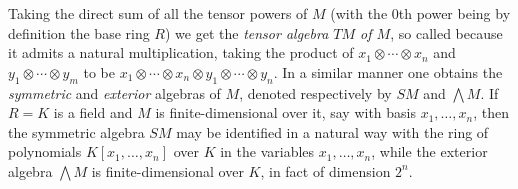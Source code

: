 \documentclass[10pt]{article}
\begin{document}
Taking the direct sum of all the tensor powers of $M$ (with the $0$th
power being by definition the base ring $R$) we get the {\sl tensor
  algebra $TM$ of $M$}, so called because it admits a natural
multiplication, taking the product of $x_1\otimes\cdots\otimes x_n$ and
$y_1\otimes\cdots\otimes y_m$ to be $x_1\otimes\cdots\otimes x_n\otimes
y_1\otimes\cdots\otimes y_n$. In a similar manner one obtains the {\sl
  symmetric} and {\sl exterior} algebras of $M$, denoted respectively by
$SM$ and $\bigwedge M$. If $R=K$ is a field and $M$ is
finite-dimensional over it, say with basis $x_1,\ldots,x_n$, then the
symmetric algebra $SM$ may be identified in a natural way with the ring
of polynomials $K[x_1,\ldots,x_n]$ over $K$ in the variables
$x_1,\ldots,x_n$, while the exterior algebra $\bigwedge M$ is
finite-dimensional over $K$, in fact of dimension $2^n$.
\end{document}
